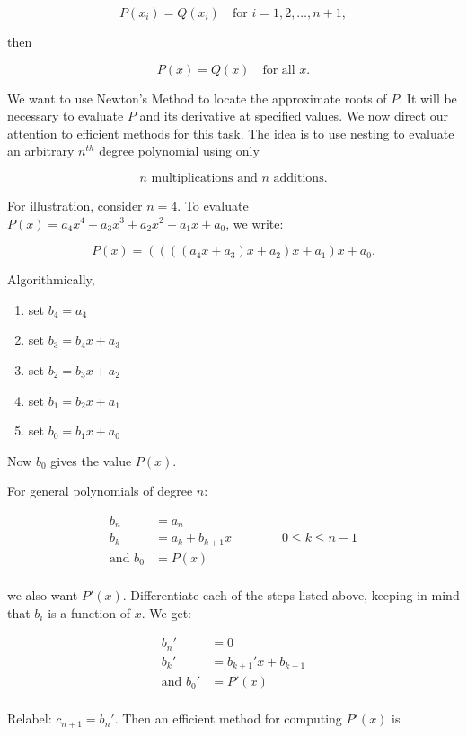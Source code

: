 \[
  P(x_i) = Q(x_i) \quad \text{for } i = 1,2, \dots, n+1,
\]

then 

\[
  P(x) = Q(x) \quad \text{for all } x.
\]

We want to use Newton's Method to locate the approximate roots of $P$. It will
be necessary to evaluate $P$ and its derivative at specified values. We now 
direct our attention to efficient methods for this task. The idea is to use 
nesting to evaluate an arbitrary $n^{th}$ degree polynomial using only

\[
  n \text{ multiplications and } n \text{ additions}
.\]

For illustration, consider $n=4$. To evaluate 
$P(x) = a_4x^4 + a_3x^3 + a_2x^2 + a_1x+a_0$, we write:

\[
  P(x) = \left(\left(\left(\left(a_4x+a_3\right)x+a_2\right)x+a_1\right)x+a_0
.\]

Algorithmically,

\begin{enumerate}
  \item set $b_4 = a_4$
  \item set $b_3 = b_4x + a_3$
  \item set $b_2 = b_3x + a_2$
  \item set $b_1 = b_2x + a_1$
  \item set $b_0 = b_1x + a_0$
\end{enumerate}

Now $b_0$ gives the value $P(x)$.

For general polynomials of degree $n:$

\begin{align*}
  b_n &= a_n \\
  b_k &= a_k+b_{k+1}x \qquad\qquad 0 \leq k \leq n-1 \\
  \text{and } b_0 &= P(x) \\
\end{align*}

we also want $P'(x)$. Differentiate each of the steps listed above, keeping in
mind that $b_i$ is a function of $x$. We get:

\begin{align*}
  b_n ' &= 0 \\
  b_k' &= b_{k+1}'x + b_{k+1} \\
  \text{and } b_0' &= P'(x) \\
\end{align*}

Relabel: $c_{n+1} = b_n'$. Then an efficient method for computing $P'(x)$ is

